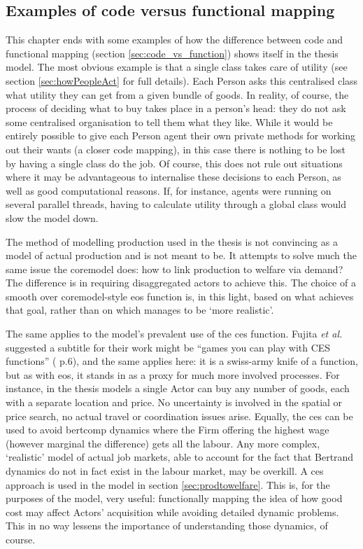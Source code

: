 {\subsection{Examples of code versus functional mapping \label{sec:examplesmapping}}

This chapter ends with some examples of how the difference between code and functional mapping (section \ref{sec:code_vs_function}) shows itself in the thesis model. The most obvious example is that a single class takes care of utility (see section \ref{sec:howPeopleAct} for full details). Each Person asks this centralised class what utility they can get from a given bundle of goods. In reality, of course, the process of deciding what to buy takes place in a person's head: they do not ask some centralised organisation to tell them what they like. While it would be entirely possible to give each Person agent their own private methods for working out their wants (a closer code mapping), in this case there is nothing to be lost by having a single class do the job.  Of course, this does not rule out situations where it may be advantageous to internalise these decisions to each Person, as well as good computational reasons. If, for instance, agents were running on several parallel threads, having to calculate utility through a global class would slow the model down.

The method of modelling production used in the thesis is not convincing as a model of actual production and is not meant to be. It attempts to solve much the same issue the \gls{coremodel} does: how to link production to welfare via demand? The difference is in requiring disaggregated actors to achieve this. The choice of a smooth over \gls{coremodel}-style \gls{eos} function is, in this light, based on what achieves that goal, rather than on which manages to be `more realistic'. 

The same applies to the model's prevalent use of the \gls{ces} function. Fujita \emph{et al.} suggested a subtitle for their work might be ``games you can play with CES functions'' (\citealt{fujita_spatial_2001} p.6), and the same applies here: it is a swiss-army knife of a function, but as with \gls{eos}, it stands in as a proxy for much more involved processes. For instance, in the thesis models a single Actor can buy any number of goods, each with a separate location and price. No uncertainty is involved in the spatial or price search, no actual travel or coordination issues arise. Equally, the \gls{ces} can be used to avoid \gls{bertcomp} dynamics where the Firm offering the highest wage (however marginal the difference) gets all the labour. Any more complex, `realistic' model of actual job markets, able to account for the fact that Bertrand dynamics do not in fact exist in the labour market, may be overkill. A \gls{ces} approach is used in the model in section \ref{sec:prodtowelfare}. This is, for the purposes of the model, very useful: functionally mapping the idea of how good cost may affect Actors' acquisition while avoiding detailed dynamic problems. This in no way lessens the importance of understanding those dynamics, of course.

}
